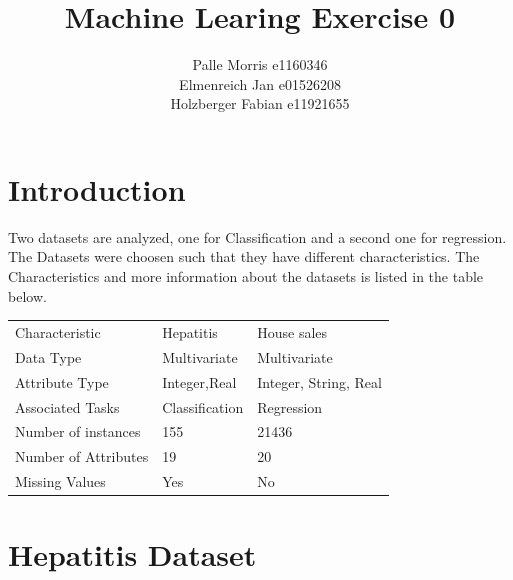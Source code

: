 \documentclass[11pt]{article}
\begin{document}
\graphicspath{{./figures/}}
\author{Palle Morris e1160346\\ Elmenreich Jan e01526208\\ Holzberger Fabian e11921655 }
\title{Machine Learing Exercise 0}
\maketitle

\medskip

\section{Introduction}
Two datasets are analyzed, one for Classification and a second one for regression. The Datasets were choosen such that they have different characteristics. The Characteristics and more information about the datasets is listed in the table below.
\begin{table}[H]
\begin{tabularx}{1.0\linewidth}{XXX}
\hline
Characteristic 		& Hepatitis 	& House sales   \\
Data Type 		& Multivariate 	& Multivariate \\
Attribute Type  	& Integer,Real  & Integer, String, Real\\
Associated Tasks	& Classification & Regression \\
Number of instances     & 155 		 & 21436\\
Number of Attributes    & 19 		& 20\\
Missing Values 		& Yes 		& No \\
\hline
\end{tabularx}
\end{table}



\section{Hepatitis Dataset}
\newpage
\end{document}
